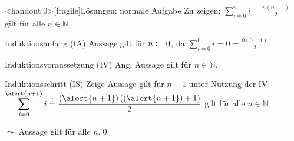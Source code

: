 {\begin{frame}<handout:0>[fragile]{Lösungen: normale Aufgabe}
    Zu zeigen: $\displaystyle\sum_{i=0}^{n} i = \frac{n(n+1)}{2}$ gilt für alle $n \in \mathbb{N}$.
    \begin{alertblock}{Induktionsanfang (IA)}
        Aussage gilt für $n\vcentcolon= 0$, da $\displaystyle\sum_{i=0}^{0} i = 0 = \frac{0(0+1)}{2}$.
    \end{alertblock}
    \begin{alertblock}{Induktionsvoraussetzung (IV)}
        Ang. Aussage gilt für $n \in\mathbb{N}$.
    \end{alertblock}
    \begin{alertblock}{Induktionsschritt (IS)}
        Zeige Aussage gilt für $n+1$ unter Nutzung der IV:\\
        $\displaystyle\sum_{i=0}^{\alert{n+1}} i \overset{!}{=} \frac{(\alert{n+1})\left((\alert{n+1})+1\right)}{2}$ gilt für alle $n \in \mathbb{N}$
    \end{alertblock}
    \alert{$\leadsto$ Aussage gilt für alle $n$.}\qed
\end{frame}
}


